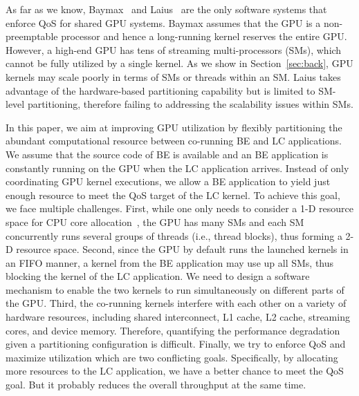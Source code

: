 As far as we know, Baymax~\cite{Chen+:ASPLOS16} and Laius~\cite{laius} are the only software systems that enforce QoS for shared GPU systems. %
Baymax assumes that the GPU is a non-preemptable processor and hence a long-running kernel reserves the entire GPU. However, a high-end GPU has tens of streaming multi-processors (SMs), which cannot be fully utilized by a single kernel. As we show in Section~\ref{sec:back}, GPU kernels may scale poorly in terms of SMs or threads within an SM. Laius takes advantage of the hardware-based partitioning capability but is limited to SM-level partitioning, therefore failing to addressing the scalability issues within SMs.

In this paper, we aim at improving GPU utilization by flexibly partitioning the abundant computational resource between co-running BE and LC applications. We assume that the source code of BE is available and an BE application is constantly running on the GPU when the LC application arrives. Instead of only coordinating GPU kernel executions, we allow a BE application to yield just enough resource to meet the QoS target of the LC kernel. To achieve this goal, we face multiple challenges. First, while one only needs to consider a 1-D resource space for CPU core allocation~\cite{Mars:MICRO2011}, the GPU has many SMs and each SM concurrently runs several groups of threads (i.e., thread blocks), thus forming a 2-D resource space. Second, since the GPU by default runs the launched kernels in an FIFO manner, a kernel from the BE application may use up all SMs, thus blocking the kernel of the LC application. We need to design a software mechanism to enable the two kernels to run simultaneously on different parts of the GPU. Third, the co-running kernels interfere with each other on a variety of hardware resources, including shared interconnect, L1 cache, L2 cache, streaming cores, and device memory. Therefore, quantifying the performance degradation given a partitioning configuration is difficult. Finally, we try to enforce QoS and maximize utilization which are two conflicting goals. Specifically, by allocating more resources to the LC application, we have a better chance to meet the QoS goal. But it probably reduces the overall throughput at the same time.


